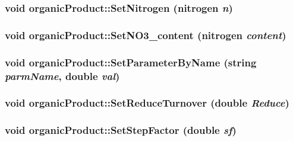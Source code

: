 \hypertarget{classorganic_product_a1da1b32c1a68a787fade1b1f6af1a85e}{
\subsubsection[{SetNitrogen}]{\setlength{\rightskip}{0pt plus 5cm}void organicProduct::SetNitrogen ({\bf nitrogen} {\em n})}}
\label{classorganic_product_a1da1b32c1a68a787fade1b1f6af1a85e}
\hypertarget{classorganic_product_ae2618cd8eb23583035214d37cb4fbe0f}{
\subsubsection[{SetNO3\_\-content}]{\setlength{\rightskip}{0pt plus 5cm}void organicProduct::SetNO3\_\-content ({\bf nitrogen} {\em content})}}
\label{classorganic_product_ae2618cd8eb23583035214d37cb4fbe0f}
\hypertarget{classorganic_product_aad6b0a71fb2db562996e41d9e169c7ca}{
\subsubsection[{SetParameterByName}]{\setlength{\rightskip}{0pt plus 5cm}void organicProduct::SetParameterByName (string {\em parmName}, \/  double {\em val})}}
\label{classorganic_product_aad6b0a71fb2db562996e41d9e169c7ca}
\hypertarget{classorganic_product_abe76058995d85817daf3bcf02e7f24bb}{
\subsubsection[{SetReduceTurnover}]{\setlength{\rightskip}{0pt plus 5cm}void organicProduct::SetReduceTurnover (double {\em Reduce})}}
\label{classorganic_product_abe76058995d85817daf3bcf02e7f24bb}
\hypertarget{classorganic_product_af925a90ee49c9f5ec1ab117ab4de0405}{
\subsubsection[{SetStepFactor}]{\setlength{\rightskip}{0pt plus 5cm}void organicProduct::SetStepFactor (double {\em sf})}}
\label{classorganic_product_af925a90ee49c9f5ec1ab117ab4de0405}


